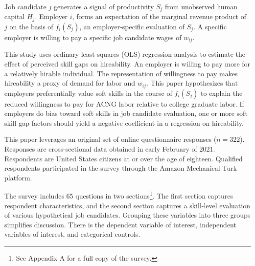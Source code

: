 \documentclass[review]{elsarticle}
\begin{document}
Job candidate $j$ generates a signal of productivity $S_j$ from unobserved human capital $H_j$.
Employer $i$, forms an expectation of the marginal revenue product of $j$ on the basis of $f_i(S_j)$, an employer-specific evaluation of $S_j$.
A specific employer is willing to pay a specific job candidate wages of $w_{ij}$.

This study uses ordinary least squares (OLS) regression analysis to estimate the effect of perceived skill gaps on hireability.
An employer is willing to pay more for a relatively hirable individual.
The representation of willingness to pay makes hireability a proxy of demand for labor and $w_{ij}$.
%
This paper hypothesizes that employers preferentially value soft skills in the course of $f_i(S_j)$
to explain the reduced willingness to pay for ACNG labor relative to college graduate labor.
If employers do bias toward soft skills in job candidate evaluation,
one or more soft skill gap factors should yield a negative coefficient
in a regression on hireability.

This paper leverages an original set of online questionnaire responses ($n = 322$).
Responses are cross-sectional data obtained in early February of 2021.
Respondents are United States citizens at or over the age of eighteen.
Qualified respondents participated in the survey through the Amazon Mechanical Turk platform.

The survey includes 65 questions in two sections\footnote{See Appendix A for a full copy of the survey.}.
The first section captures respondent characteristics, and the second section captures a skill-level evaluation of various hypothetical job candidates.
Grouping these variables into three groups simplifies discussion.
There is the dependent variable of interest, independent variables of interest, and categorical controls.
\end{document}
